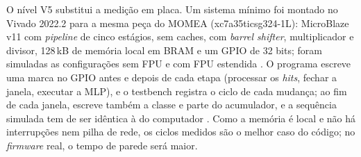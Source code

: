 O nível V5 substitui a medição em placa. Um sistema mínimo foi montado no Vivado 2022.2 para a mesma peça do MOMEA (xc7a35ticsg324-1L): MicroBlaze v11 com \textit{pipeline} de cinco estágios, sem caches, com \textit{barrel shifter}, multiplicador e divisor, 128\,kB de memória local em BRAM e um GPIO de 32 bits; foram simuladas as configurações sem FPU e com FPU estendida \cite{amd_ug984}. O programa escreve uma marca no GPIO antes e depois de cada etapa (processar os \textit{hits}, fechar a janela, executar a MLP), e o testbench registra o ciclo de cada mudança; ao fim de cada janela, escreve também a classe e parte do acumulador, e a sequência simulada tem de ser idêntica à do computador \cite{amd_ug900}. Como a memória é local e não há interrupções nem pilha de rede, os ciclos medidos são o melhor caso do código; no \textit{firmware} real, o tempo de parede será maior.

